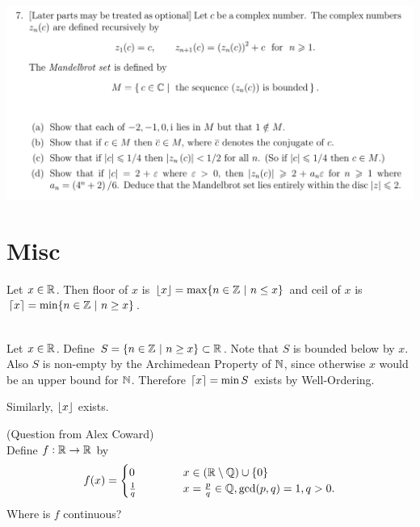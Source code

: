 \documentclass[12pt]{article}
\begin{document}
\subsection{}
\begin{mdframed}
\includegraphics[width=400pt]{img/oxford-M2-analysis-I-3-7.png}
\end{mdframed}



\newpage
\section{Misc}
\newpage
\begin{definition*}
  Let $x \in \mathbb{R}$. Then floor of $x$ is $\lfloor x\rfloor = \max\{n \in \mathbb{Z} ~|~ n \leq x\}$ and ceil of $x$
  is $\lceil x\rceil = \min\{n \in \mathbb{Z} ~|~ n \geq x\}$.
\end{definition*}

\begin{theorem*}~\\
  Let $x \in \mathbb{R}$. Define $S = \{n \in \mathbb{Z} ~|~ n \geq x\} \subset \mathbb{R}$. Note that $S$ is bounded below
  by $x$. Also $S$ is non-empty by the Archimedean Property of $\mathbb{N}$, since otherwise $x$ would be
  an upper bound for $\mathbb{N}$. Therefore $\lceil x\rceil = \min S$ exists by Well-Ordering.

  Similarly, $\lfloor x\rfloor$ exists.
\end{theorem*}

\begin{mdframed}
  (Question from Alex Coward)\\

  Define $f:\mathbb{R}\to\mathbb{R}$ by
  \begin{align*}
    f(x) =
    \begin{cases}
      0 ~~~~~~~~~~  & x \in (\mathbb{R}\setminus\mathbb{Q})\cup\{0\}\\
     \frac{1}{q}    & x = \frac{p}{q} \in \mathbb{Q}, \gcd(p, q) = 1, q > 0.
    \end{cases}
  \end{align*}
  Where is $f$ continuous?
\end{mdframed}
\end{document}

